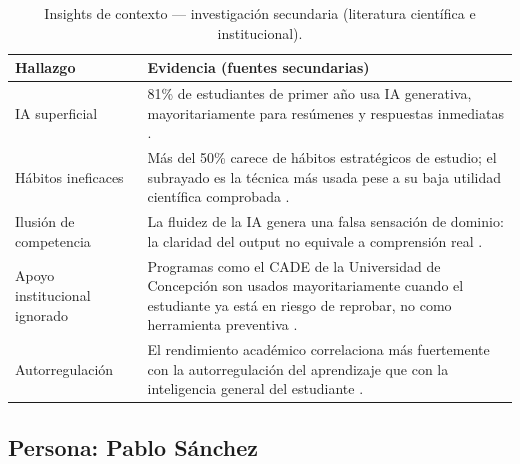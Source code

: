 \documentclass[11pt,a4paper]{article}
\begin{document}
\begin{table}[H]
\centering
\small
\begin{tabularx}{\textwidth}{@{}l Y@{}}
\toprule
\textbf{Hallazgo} & \textbf{Evidencia (fuentes secundarias)} \\
\midrule
IA superficial & 81\% de estudiantes de primer a\~no usa IA generativa, mayoritariamente para res\'umenes y respuestas inmediatas \cite{uchile81}. \\
H\'abitos ineficaces & M\'as del 50\% carece de h\'abitos estrat\'egicos de estudio; el subrayado es la t\'ecnica m\'as usada pese a su baja utilidad cient\'ifica comprobada \cite{dialnet8083934}. \\
Ilusi\'on de competencia & La fluidez de la IA genera una falsa sensaci\'on de dominio: la claridad del output no equivale a comprensi\'on real \cite{brunner2025}. \\
Apoyo institucional ignorado & Programas como el CADE de la Universidad de Concepci\'on son usados mayoritariamente cuando el estudiante ya est\'a en riesgo de reprobar, no como herramienta preventiva \cite{cade}. \\
Autorregulaci\'on & El rendimiento acad\'emico correlaciona m\'as fuertemente con la autorregulaci\'on del aprendizaje que con la inteligencia general del estudiante \cite{redalyc44074795017}. \\
\bottomrule
\end{tabularx}
\caption{Insights de contexto --- investigaci\'on secundaria (literatura cient\'ifica e institucional).}
\end{table}

\subsection{Persona: Pablo S\'anchez}
\end{document}
